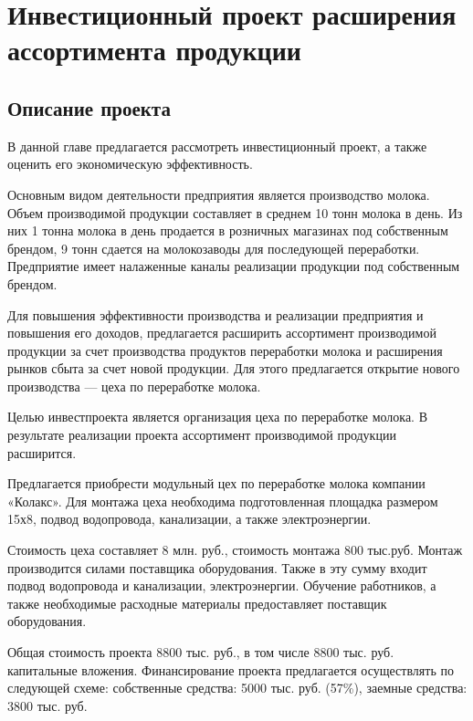 \section{Инвестиционный проект расширения ассортимента продукции}
\subsection*{Описание проекта}
В данной главе предлагается рассмотреть инвестиционный проект, а также оценить его экономическую эффективность.

Основным видом деятельности предприятия является производство молока. Объем производимой продукции составляет в среднем 10 тонн молока в день. Из них 1 тонна молока в день продается в розничных магазинах под собственным брендом, 9 тонн сдается на молокозаводы для последующей переработки. %
Предприятие имеет налаженные каналы реализации продукции под собственным брендом. 

Для повышения эффективности производства и реализации предприятия и повышения его доходов, предлагается расширить ассортимент производимой продукции за счет производства продуктов переработки молока и расширения рынков сбыта за счет новой продукции. Для этого предлагается открытие нового производства --- цеха по переработке молока.

Целью инвестпроекта является организация цеха по переработке молока. В результате реализации проекта ассортимент производимой продукции расширится. 

Предлагается приобрести модульный цех по переработке молока компании «Колакс». Для монтажа цеха необходима подготовленная площадка размером 15х8, подвод водопровода, канализации, а также электроэнергии.

Стоимость цеха составляет 8 млн. руб., стоимость монтажа 800 тыс.руб. Монтаж производится силами поставщика оборудования. Также в эту сумму входит подвод водопровода и канализации, электроэнергии. Обучение работников, а также необходимые расходные материалы предоставляет поставщик оборудования.

Общая стоимость проекта 8800 тыс. руб., в том числе 8800 тыс. руб. капитальные вложения. Финансирование проекта предлагается осуществлять по следующей схеме: собственные средства: 5000 тыс. руб. (57\%), заемные средства: 3800 тыс. руб.


